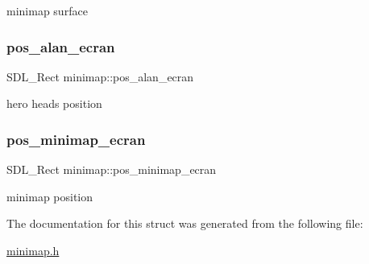 minimap surface \mbox{\label{structminimap_a2e69532c0a618345744010f7605e3f80}} 
\subsubsection{\texorpdfstring{pos\+\_\+alan\+\_\+ecran}{pos\_alan\_ecran}}
{\footnotesize\ttfamily S\+D\+L\+\_\+\+Rect minimap\+::pos\+\_\+alan\+\_\+ecran}

hero head\textquotesingle{}s position \mbox{\label{structminimap_a402dcb23bc8c2d4077c0773579ef6606}} 
\subsubsection{\texorpdfstring{pos\+\_\+minimap\+\_\+ecran}{pos\_minimap\_ecran}}
{\footnotesize\ttfamily S\+D\+L\+\_\+\+Rect minimap\+::pos\+\_\+minimap\+\_\+ecran}

minimap position 

The documentation for this struct was generated from the following file\+:\begin{DoxyCompactItemize}
\item 
\hyperlink{minimap_8h}{minimap.\+h}\end{DoxyCompactItemize}
